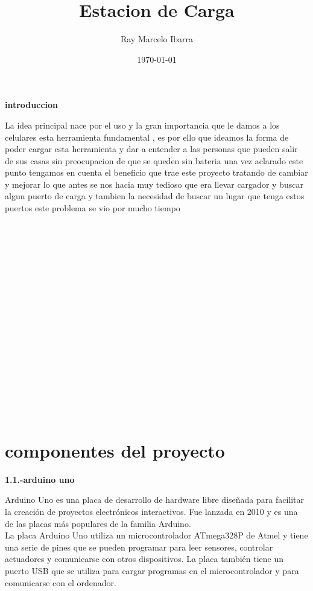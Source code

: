 \documentclass[11pt, letterpaper]{article}
\title{Estacion de Carga }
\author{Ray Marcelo Ibarra }
\date{\today}
\begin{document}
\maketitle

\begin{center}  
    \textbf{introduccion}
\end{center}
La idea principal nace por el uso y la gran importancia que le damos a los celulares esta herramienta fundamental 
, es por ello que ideamos la forma de poder cargar esta herramienta y dar a entender a las personas que pueden salir 
de sus casas sin preocupacion de que se queden sin bateria 
una vez aclarado este punto tengamos en cuenta el beneficio que trae este proyecto 
tratando de cambiar y mejorar lo que antes se nos hacia muy tedioso que era llevar 
cargador y buscar algun puerto de carga y tambien la necesidad de buscar un lugar que 
tenga estos puertos este problema se vio por mucho tiempo
\\ \\
\\ \\
\\ \\
\\ \\
\\ \\
\\ \\
\\ \\
\\ \\
\\ \\
\tableofcontents

\section{componentes del proyecto}
\begin{center}
    \textbf{1.1.-arduino uno}
\end{center}
Arduino Uno es una placa de desarrollo de hardware libre diseñada para facilitar la creación de 
proyectos electrónicos interactivos.
Fue lanzada en 2010 y es una de las placas más populares de la familia Arduino.\\
La placa Arduino Uno utiliza un microcontrolador ATmega328P de Atmel y tiene una serie de pines que se pueden 
programar para leer sensores, controlar 
actuadores y comunicarse con otros dispositivos. 
La placa también tiene un puerto USB que se utiliza para 
cargar programas en el microcontrolador
 y para comunicarse con el ordenador.\\
\end{document}
